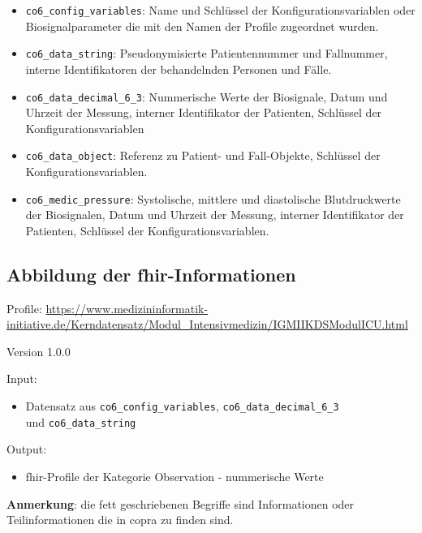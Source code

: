 \begin{itemize}
  \item \texttt{co6\_config\_variables}: Name und Schlüssel der Konfigurationsvariablen oder Biosignalparameter die mit den Namen der Profile zugeordnet wurden.
  \item \texttt{co6\_data\_string}: Pseudonymisierte Patientennummer und Fallnummer, interne Identifikatoren der behandelnden Personen und Fälle.
  \item \texttt{co6\_data\_decimal\_6\_3}: Nummerische Werte der Biosignale, Datum und Uhrzeit der Messung, interner Identifikator der Patienten, Schlüssel der Konfigurationsvariablen
  \item \texttt{co6\_data\_object}: Referenz zu Patient- und Fall-Objekte, Schlüssel der Konfigurationsvariablen.
  \item \texttt{co6\_medic\_pressure}: Systolische, mittlere und diastolische Blutdruckwerte der Biosignalen, Datum und Uhrzeit der Messung, interner Identifikator der Patienten, Schlüssel der Konfigurationsvariablen.
\end{itemize}
\vspace{4mm}

\subsection{Abbildung der \acs{fhir}-Informationen} \label{subsec:coprareflexfhir}

\noindent Profile: \url{https://www.medizininformatik-initiative.de/Kerndatensatz/Modul_Intensivmedizin/IGMIIKDSModulICU.html}

\noindent Version 1.0.0

\noindent Input:
\begin{itemize}
	\item Datensatz aus \texttt{co6\_config\_variables}, \texttt{co6\_data\_decimal\_6\_3} \\ und \texttt{co6\_data\_string}
\end{itemize}
Output:
\begin{itemize}
	\item \ac{fhir}-Profile der Kategorie \glqq Observation\grqq{} - nummerische Werte %
\end{itemize}

\noindent \textbf{Anmerkung}: die fett geschriebenen Begriffe sind Informationen oder Teilinformationen die in \ac{copra} zu finden sind. 

